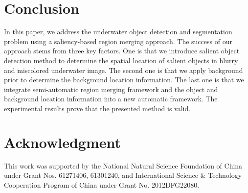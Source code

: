 \documentclass[conference]{IEEEtran}
\begin{document}




\section{Conclusion}
In this paper, we address the underwater object detection and segmentation problem using a saliency-based region merging approach. The success of our approach stems from three key factors. One is that we introduce salient object detection method to determine the spatial location of salient objects in blurry and miscolored underwater image. The second one is that we apply background prior to determine the background location information. The last one is that we integrate semi-automatic region merging framework and the object and background location information into a new automatic framework. The experimental results prove that the presented method is valid.






\section*{Acknowledgment}

This work was supported by the National Natural Science Foundation of China under Grant Nos. 61271406, 61301240, and International Science \& Technology Cooperation Program of China under Grant No. 2012DFG22080.




\end{document}
